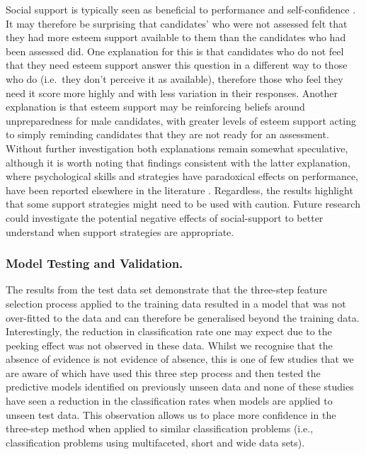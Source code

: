 \documentclass[
  12pt,
  a4paper,
]{book}
\begin{document}
Social support is typically seen as beneficial to performance and self-confidence \citep{Rees2007}. It may therefore be surprising that candidates' who were not assessed felt that they had more esteem support available to them than the candidates who had been assessed did. One explanation for this is that candidates who do not feel that they need esteem support answer this question in a different way to those who do (i.e.~they don't perceive it as available), therefore those who feel they need it score more highly and with less variation in their responses. Another explanation is that esteem support may be reinforcing beliefs around unpreparedness for male candidates, with greater levels of esteem support acting to simply reminding candidates that they are not ready for an assessment. Without further investigation both explanations remain somewhat speculative, although it is worth noting that findings consistent with the latter explanation, where psychological skills and strategies have paradoxical effects on performance, have been reported elsewhere in the literature \citep{Roberts2013}. Regardless, the results highlight that some support strategies might need to be used with caution. Future research could investigate the potential negative effects of social-support to better understand when support strategies are appropriate.

\hypertarget{model-testing-and-validation.-2}{%
\subsubsection{Model Testing and Validation.}\label{model-testing-and-validation.-2}}

The results from the test data set demonstrate that the three-step feature selection process applied to the training data resulted in a model that was not over-fitted to the data and can therefore be generalised beyond the training data. Interestingly, the reduction in classification rate one may expect due to the peeking effect \citep{Kuncheva2018, Reunanen2003a} was not observed in these data. Whilst we recognise that the absence of evidence is not evidence of absence, this is one of few studies that we are aware of which have used this three step process and then tested the predictive models identified on previously unseen data \citep[see][]{Jones2019b, Jones2020} and none of these studies have seen a reduction in the classification rates when models are applied to unseen test data. This observation allows us to place more confidence in the three-step method when applied to similar classification problems (i.e., classification problems using multifaceted, short and wide data sets).
\end{document}
